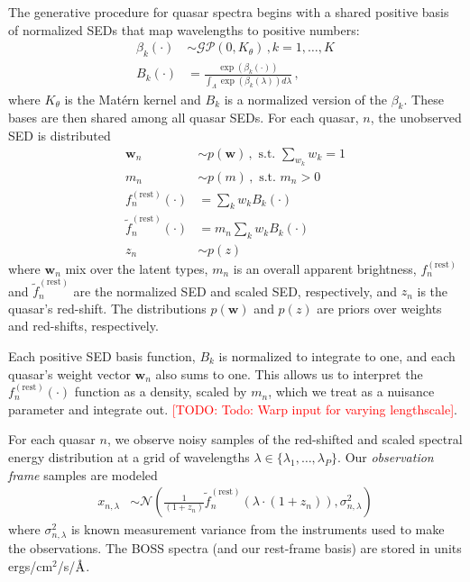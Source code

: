 \documentclass{article}
\newcommand{\angstrom}{\textup{\AA}}
\newcommand{\red}[1]{\textcolor{red}{[TODO: #1]}}
\begin{document}
The generative procedure for quasar spectra begins with a shared positive basis of normalized SEDs
that map wavelengths to positive numbers:
\begin{align}
  \beta_k(\cdot) &\sim \mathcal{GP}(0, K_\theta) \, , k=1, \dots, K\\
  B_k(\cdot) &= \frac{\exp(\beta_k(\cdot))}{\int_\Lambda \exp(\beta_k(\lambda)) d\lambda}   \, ,
\end{align}
where $K_{\theta}$ is the Mat\'{e}rn kernel and $B_k$ is a normalized version of
the $\beta_k$. These bases are then shared among all quasar SEDs.  For each quasar, $n$, the unobserved SED is distributed
\begin{align}
  \mathbf{w}_n &\sim p(\mathbf{w}) \, , \text{ s.t. } \sum_{w_k} w_k = 1  \\
  m_n  &\sim p(m) \, , \text{ s.t. } m_n > 0 \\
  f^{(\text{rest})}_n(\cdot) &= \sum_{k} w_k B_k(\cdot)\\
  \tilde f^{(\text{rest})}_n(\cdot) &= m_n \sum_{k} w_k B_k(\cdot) \\
  z_n &\sim p(z)
\end{align}
where $\mathbf{w}_n$ mix over the latent types, $m_n$ is an overall apparent brightness, $f_n^{(\text{rest})}$ and $\tilde f_n^{(\text{rest})}$ are the normalized SED and scaled SED, respectively, and $z_n$ is the quasar's red-shift.  The distributions $p(\mathbf{w})$ and $p(z)$ are priors over weights and red-shifts, respectively.  

Each positive SED basis function, $B_k$ is normalized to integrate to one, and each quasar's weight vector $\mathbf{w}_n$ also sums to one.  This allows us to interpret the $f^{(\text{rest})}_n(\cdot)$ function as a density, scaled by $m_n$, which we treat as a nuisance parameter and integrate out.  
\red{Todo: Warp input for varying lengthscale}.  

For each quasar $n$, we observe noisy samples of the red-shifted and scaled spectral energy distribution at a grid of wavelengths $\lambda \in \{\lambda_1, \dots, \lambda_P \}$.  Our \emph{observation frame} samples are modeled
\begin{align}
  x_{n, \lambda} 
    &\sim \mathcal{N}\left( \frac{1}{(1 + z_n)} \tilde f_n^{(\text{rest})}( \lambda \cdot (1 + z_n) ), \sigma_{n,\lambda}^2 \right)
    \label{eq:spec} 
\end{align}
where $\sigma_{n, \lambda}^2$ is known measurement variance from the instruments
used to make the observations.
The BOSS spectra (and our rest-frame basis) are stored in units ergs/cm$^2$/s/$\angstrom$. 
\end{document}
